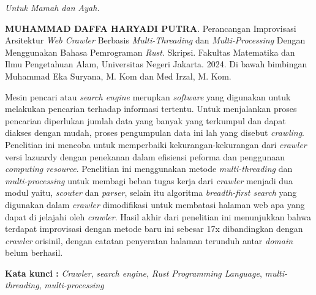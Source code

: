 \documentclass{jtetiskripsi}
\begin{document}
\cover

% 
% 
% 



\acknowledgment
\begin{flushright}
	\emph{Untuk Mamah dan Ayah.}
\end{flushright}



\begin{abstractind}
\textbf{MUHAMMAD DAFFA HARYADI PUTRA}. Perancangan Improvisasi Arsitektur \emph{Web Crawler} Berbasis \emph{Multi-Threading} dan \emph{Multi-Processing} Dengan Menggunakan Bahasa Pemrograman \emph{Rust}. Skripsi. Fakultas Matematika dan Ilmu Pengetahuan Alam, Universitas Negeri Jakarta. 2024. Di bawah bimbingan Muhammad Eka Suryana, M. Kom dan Med Irzal, M. Kom.
\vskip1cm
	
  Mesin pencari atau \emph{search engine} merupkan \emph{software} yang digunakan untuk melakukan pencarian terhadap informasi tertentu. Untuk menjalankan proses pencarian diperlukan jumlah data yang banyak yang terkumpul dan dapat diakses dengan mudah, proses pengumpulan data ini lah yang disebut \emph{crawling}. Penelitian ini mencoba untuk memperbaiki kekurangan-kekurangan dari \emph{crawler} versi lazuardy dengan penekanan dalam efisiensi peforma dan penggunaan \emph{computing resource}. Penelitian ini menggunakan metode \emph{multi-threading} dan \emph{multi-processing} untuk membagi beban tugas kerja dari \emph{crawler} menjadi dua modul yaitu, \emph{scouter} dan \emph{parser}, selain itu algoritma \emph{breadth-first search} yang digunakan dalam \emph{crawler} dimodifikasi untuk membatasi halaman web apa yang dapat di jelajahi oleh \emph{crawler}. Hasil akhir dari penelitian ini menunjukkan bahwa terdapat improvisasi dengan metode baru ini sebesar 17x dibandingkan dengan \emph{crawler} orisinil, dengan catatan penyeratan halaman terunduh antar \emph{domain} belum berhasil.
	
	\bigskip
	\noindent
  \textbf{Kata kunci :} \textit{Crawler}, \textit{search engine}, \textit{Rust Programming Language}, \textit{multi-threading}, \textit{multi-processing}
\end{abstractind}
\end{document}
